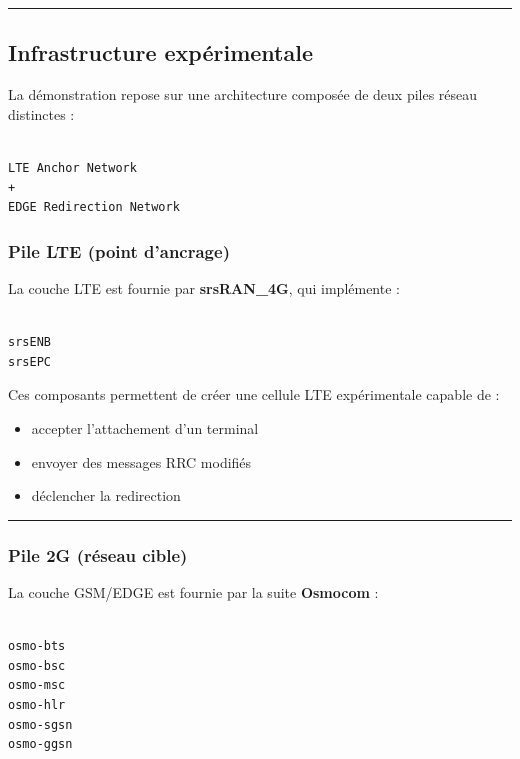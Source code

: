 \documentclass[
  french,
]{article}
\providecommand{\tightlist}{%
  \setlength{\itemsep}{0pt}\setlength{\parskip}{0pt}}
\begin{document}
\begin{center}\rule{0.5\linewidth}{0.5pt}\end{center}

\subsection{Infrastructure
expérimentale}\label{infrastructure-expuxe9rimentale}

La démonstration repose sur une architecture composée de deux piles
réseau distinctes :

\begin{verbatim}

LTE Anchor Network
+
EDGE Redirection Network
\end{verbatim}

\subsubsection{Pile LTE (point
d'ancrage)}\label{pile-lte-point-dancrage}

La couche LTE est fournie par \textbf{srsRAN\_4G}, qui implémente :

\begin{verbatim}

srsENB
srsEPC
\end{verbatim}

Ces composants permettent de créer une cellule LTE expérimentale capable
de :

\begin{itemize}
\tightlist
\item
  accepter l'attachement d'un terminal
\item
  envoyer des messages RRC modifiés
\item
  déclencher la redirection
\end{itemize}

\begin{center}\rule{0.5\linewidth}{0.5pt}\end{center}

\subsubsection{Pile 2G (réseau cible)}\label{pile-2g-ruxe9seau-cible}

La couche GSM/EDGE est fournie par la suite \textbf{Osmocom} :

\begin{verbatim}

osmo-bts
osmo-bsc
osmo-msc
osmo-hlr
osmo-sgsn
osmo-ggsn
\end{verbatim}
\end{document}
